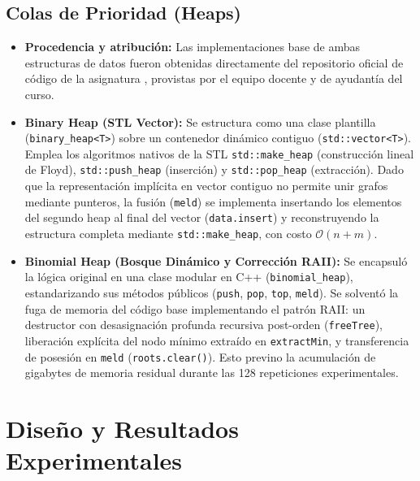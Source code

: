 \documentclass[11pt,letterpaper]{article}
\begin{document}
\subsection{Colas de Prioridad (Heaps)}
\begin{itemize}
    \item \textbf{Procedencia y atribución:}
    Las implementaciones base de ambas estructuras de datos fueron obtenidas directamente del repositorio oficial de código de la asignatura \cite{jfuentess_edaa}, provistas por el equipo docente y de ayudantía del curso. 
    
    \item \textbf{Binary Heap (STL Vector):}
    Se estructura como una clase plantilla (\texttt{binary\_heap<T>}) sobre un contenedor dinámico contiguo (\texttt{std::vector<T>}). Emplea los algoritmos nativos de la STL \texttt{std::make\_heap} (construcción lineal de Floyd), \texttt{std::push\_heap} (inserción) y \texttt{std::pop\_heap} (extracción). Dado que la representación implícita en vector contiguo no permite unir grafos mediante punteros, la fusión (\texttt{meld}) se implementa insertando los elementos del segundo heap al final del vector (\texttt{data.insert}) y reconstruyendo la estructura completa mediante \texttt{std::make\_heap}, con costo $\mathcal{O}(n + m)$.
    
    \item \textbf{Binomial Heap (Bosque Dinámico y Corrección RAII):}
    Se encapsuló la lógica original en una clase modular en C++ (\texttt{binomial\_heap}), estandarizando sus métodos públicos (\texttt{push}, \texttt{pop}, \texttt{top}, \texttt{meld}). Se solventó la fuga de memoria del código base implementando el patrón RAII: un destructor con desasignación profunda recursiva post-orden (\texttt{freeTree}), liberación explícita del nodo mínimo extraído en \texttt{extractMin}, y transferencia de posesión en \texttt{meld} (\texttt{roots.clear()}). Esto previno la acumulación de gigabytes de memoria residual durante las 128 repeticiones experimentales.
\end{itemize}

\newpage

\section{Diseño y Resultados Experimentales}
\end{document}
